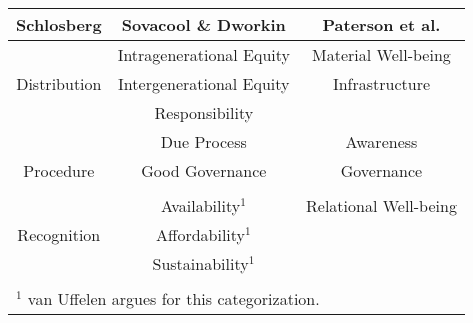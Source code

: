 \begin{tabular}{ccc}
    \toprule
    Schlosberg \cite{schlosberg_2_2007} & Sovacool \& Dworkin 
    \cite{sovacool_energy_2015}& Paterson et al. \cite{paterson_community-based_2019}\\
    \midrule
    & Intragenerational Equity & Material Well-being \\
    Distribution & Intergenerational Equity & Infrastructure \\
    & Responsibility & \\
    & Due Process & Awareness \\
    Procedure & Good Governance & Governance \\
    & & \\
    & Availability$^1$ & Relational Well-being \\
    Recognition & Affordability$^1$ & \\
    & Sustainability$^1$ & \\
    \bottomrule\\
    \multicolumn{3}{l}{$^1$ van Uffelen \cite{van_uffelen_revisiting_2022} argues for this categorization.}
\end{tabular}